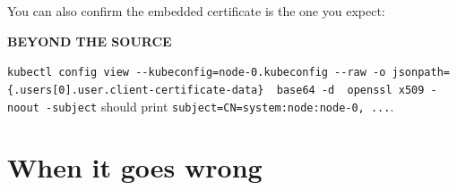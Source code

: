 \documentclass[11pt,oneside]{report}
\newcommand{\calloutlabel}[2]{{\sffamily\bfseries\footnotesize\color{#1}#2\quad}}
\begin{document}
You can also confirm
the embedded
certificate is the
one you expect:

\begin{beyondbox}\calloutlabel{teal}{BEYOND THE SOURCE}

\texttt{kubectl\ config\ view\ -\/-kubeconfig=node-}\allowbreak{}\texttt{0.}\allowbreak{}\texttt{kubeconfig\ -\/-raw\ -}\allowbreak{}\texttt{o\ jsonpath=\textquotesingle{}\{.}\allowbreak{}\texttt{users{[}0{]}.}\allowbreak{}\texttt{user.}\allowbreak{}\texttt{client-}\allowbreak{}\texttt{certificate-}\allowbreak{}\texttt{data\}\textquotesingle{}\ \textbar{}\ base64\ -}\allowbreak{}\texttt{d\ \textbar{}\ openssl\ x509\ -}\allowbreak{}\texttt{noout\ -}\allowbreak{}\texttt{subject}
should print
\texttt{subject=CN=system:}\allowbreak{}\texttt{node:}\allowbreak{}\texttt{node-}\allowbreak{}\texttt{0,\ .}\allowbreak{}\texttt{.}\allowbreak{}\texttt{.}\allowbreak{}.

\end{beyondbox}

\hypertarget{when-it-goes-wrong-4}{%
\section{When it
goes
wrong}\label{when-it-goes-wrong-4}}
\end{document}
